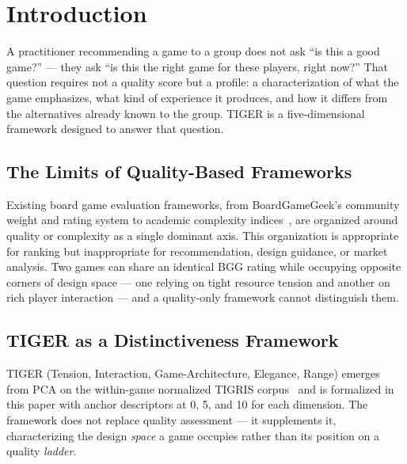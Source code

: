 \section{Introduction}
\label{sec:intro}

A practitioner recommending a game to a group does not ask ``is this a good game?'' ---
they ask ``is this the right game for these players, right now?'' That question requires
not a quality score but a profile: a characterization of what the game emphasizes,
what kind of experience it produces, and how it differs from the alternatives already
known to the group. TIGER is a five-dimensional framework designed to answer that question.

\subsection{The Limits of Quality-Based Frameworks}

Existing board game evaluation frameworks, from BoardGameGeek's community weight and
rating system to academic complexity indices~\cite{woods2012eurogames,
zagal2008collaborative}, are organized around quality or complexity as a single dominant
axis. This organization is appropriate for ranking but inappropriate for recommendation,
design guidance, or market analysis. Two games can share an identical BGG rating while
occupying opposite corners of design space --- one relying on tight resource tension and
another on rich player interaction --- and a quality-only framework cannot distinguish them.

\subsection{TIGER as a Distinctiveness Framework}

TIGER (Tension, Interaction, Game-Architecture, Elegance, Range) emerges from PCA on
the within-game normalized TIGRIS corpus~\cite{dellaLibera2026pca} and is formalized in
this paper with anchor descriptors at 0, 5, and 10 for each dimension. The framework
does not replace quality assessment --- it supplements it, characterizing the design
\emph{space} a game occupies rather than its position on a quality \emph{ladder}.
